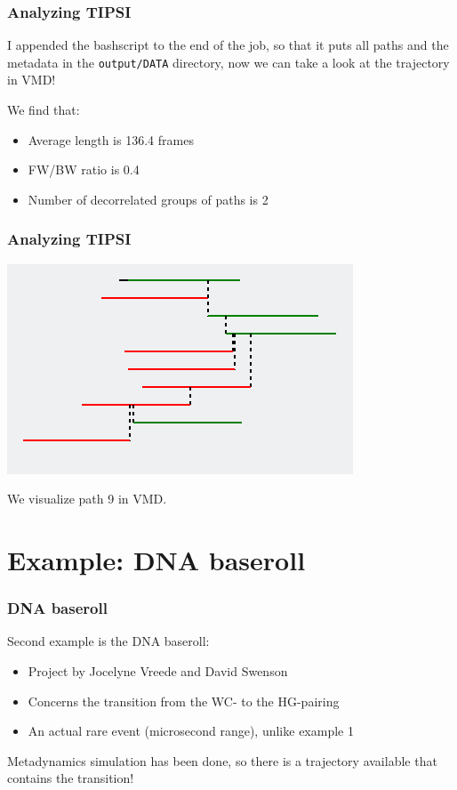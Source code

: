 \documentclass[hyperref={pdfpagelabels=false}]{beamer}
\begin{document}
\begin{frame}
\frametitle{Analyzing \textsc{TIPSI}} 

I appended the bashscript to the end of the job, so that it puts all paths and the metadata in the \texttt{output/DATA} directory, now we can take a look at the trajectory in VMD! 

We find that:

\begin{itemize}
\item Average length is 136.4 frames
\item FW/BW ratio is 0.4
\item Number of decorrelated groups of paths is 2
\end{itemize}

\end{frame}

\begin{frame}
\frametitle{Analyzing \textsc{TIPSI}} 
\begin{center}
\includegraphics[scale=1]{images/tree.png}
\end{center}
We visualize path 9 in VMD.
\end{frame}

\section{Example: DNA baseroll}
\setcounter{subsection}{1}


\begin{frame}
\frametitle{DNA baseroll} 
Second example is the DNA baseroll:
\begin{itemize}
\item Project by Jocelyne Vreede and David Swenson
\item Concerns the transition from the WC- to the HG-pairing
\item An actual rare event (microsecond range), unlike example 1
\end{itemize}
Metadynamics simulation has been done, so there is a trajectory available that contains the transition!
\end{frame}
\end{document}
